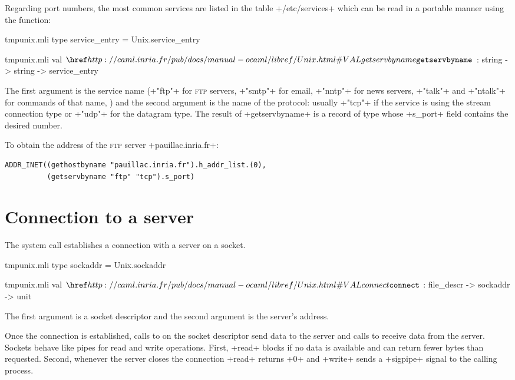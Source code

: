 Regarding port numbers, the most common services are listed in the
table \ml+/etc/services+ which can be read in a portable manner using
the  function:
%
\begin{codefile}{tmpunix.mli}
type service_entry = Unix.service_entry
\end{codefile}
%
\begin{listingcodefile}{tmpunix.mli}
val $\libvalue{Unix}{getservbyname}$ : string -> string -> service_entry
\end{listingcodefile}
% 
The first argument is the service name (\ml+"ftp"+ for \textsc{ftp}
servers, \ml+"smtp"+ for email, \ml+"nntp"+ for news servers,
\ml+"talk"+ and \ml+"ntalk"+ for commands of that name, \etc) and the
second argument is the name of the protocol: usually \ml+"tcp"+ if the
service is using the stream connection type or \ml+"udp"+ for the
datagram type. The result of \ml+getservbyname+ is a record of type
 whose \ml+s_port+ field contains the
desired number.

\begin{example} To obtain the address of the \textsc{ftp} server
\ml+pauillac.inria.fr+:
%
\begin{lstlisting}
ADDR_INET((gethostbyname "pauillac.inria.fr").h_addr_list.(0),
          (getservbyname "ftp" "tcp").s_port)
\end{lstlisting}
\enlargethispage{1\onelineskip} %
\end{example}

\pagebreak

\section{Connection to a server}

The system call  establishes a connection with a
server on a socket. 
%
\begin{codefile}{tmpunix.mli}
type sockaddr = Unix.sockaddr
\end{codefile}
%
\begin{listingcodefile}{tmpunix.mli}
val $\libvalue{Unix}{connect}$ : file_descr -> sockaddr -> unit
\end{listingcodefile}
%
The first argument is a socket descriptor and the second argument is
the server's address.

Once the connection is established, calls to  on the
socket descriptor send data to the server and calls to 
receive data from the server. Sockets behave like pipes for read and
write operations. First, \ml+read+ blocks if no data is available and
can return fewer bytes than requested. Second, whenever the server
closes the connection \ml+read+ returns \ml+0+ and \ml+write+ sends a
\ml+sigpipe+ signal to the calling process.

